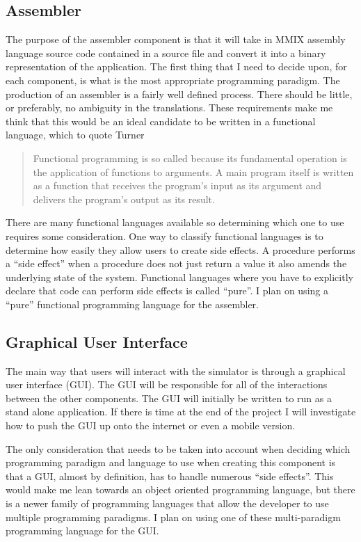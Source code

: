 \documentclass[11pt]{article} %
\begin{document}
\subsection{Assembler}
The purpose of the assembler component is that it will take in MMIX assembly language source code contained in a source file and convert it into a binary representation of the application.  The first thing that I need to decide upon, for each component, is what is the most appropriate programming paradigm.  The production of an assembler is a fairly well defined process.  There should be little, or preferably, no ambiguity in the translations.  These requirements make me think that this would be an ideal candidate to be written in a functional language, which to quote Turner~\cite{turner:why}
\begin{quote}Functional programming is so called because its fundamental operation is the application of functions to arguments. A main program itself is written as a function that receives the program’s input as its argument and delivers the program’s output as its result.\end{quote}
	
There are many functional languages available so determining which one to use requires some consideration.  One way to classify functional languages is to determine how easily they allow users to create side effects. A procedure performs a ``side effect'' when a procedure does not just return a value it also amends the underlying state of the system.   Functional languages where you have to explicitly declare that code can perform side effects is called ``pure''.  
I plan on using a ``pure'' functional programming language for the assembler.
\subsection{Graphical User Interface}
The main way that users will interact with the simulator is through a graphical user interface (GUI).  The GUI will be responsible for all of the interactions between the other components. The GUI will initially be written to run as a stand alone application.  If there is time at the end of the project I  will investigate how to push the GUI up onto the internet or even a mobile version.

The only consideration that needs to be taken into account when deciding which programming paradigm and language to use when creating this component is that a GUI, almost by definition, has to handle numerous ``side effects''. This would make me lean towards an object oriented programming language, but there is a newer family of programming languages that allow the developer to use multiple programming paradigms. I plan on using one of these multi-paradigm programming language for the GUI.
\end{document}
